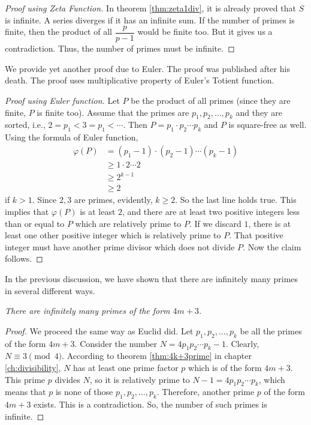 \documentclass{subfiles}
\begin{document}
		\begin{proof}[Proof using Zeta Function]
			In theorem \autoref{thm:zeta1div}, it is already proved that $S$ is infinite. A series diverges if it has an infinite sum. If the number of primes is finite, then the product of all $\dfrac p{p-1}$ would be finite too. But it gives us a contradiction. Thus, the number of primes must be infinite.
		\end{proof}
	We provide yet another proof due to Euler. The proof was published after his death. The proof uses multiplicative property of Euler's Totient function.
		\begin{proof}[Proof using Euler function]
			Let $P$ be the product of all primes (since they are finite, $P$ is finite too). Assume that the primes are $p_1,p_2,\ldots, p_k$ and they are sorted, i.e., $2=p_1<3=p_1<\cdots$. Then $P = p_1\cdot p_2\cdots p_k$ and $P$ is square-free as well. Using the formula of Euler function,
				\begin{align*}
					\varphi(P)  & = (p_1-1)\cdot(p_2-1)\cdots(p_k-1)\\
							& \geq 1\cdot2\cdots2\\
							& \geq 2^{k-1}\\
							& \geq 2
				\end{align*}
			if $k>1$. Since $2,3$ are primes, evidently, $k\geq2$. So the last line holds true. This implies that $\varphi(P)$ is at least $2$, and there are at least two positive integers less than or equal to $P$ which are relatively prime to $P$. If we discard $1$, there is at least one other positive integer which is relatively prime to $P$. That positive integer must have another prime divisor which does not divide $P$. Now the claim follows.
		\end{proof}
	In the previous discussion, we have shown that there are infinitely many primes in several different ways.
		\begin{theorem}\slshape
			There are infinitely many primes of the form $4m+3$.
		\end{theorem}

		\begin{proof}
			We proceed the same way as Euclid did. Let $p_1,p_2,\ldots,p_k$ be all the primes of the form $4m+3$. Consider the number $N=4p_1p_2\cdots p_k-1$. Clearly, $N\equiv3\pmod4$. According to theorem \autoref{thm:4k+3prime} in chapter \eqref{ch:divisibility}, $N$ has at least one prime factor $p$ which is of the form $4m+3$. This prime $p$ divides $N$, so it is relatively prime to $N-1=4p_1p_2\cdots p_k$, which means that $p$ is none of those $p_1,p_2,\ldots,p_k$. Therefore, another prime $p$ of the form $4m+3$ exists. This is a contradiction. So, the number of such primes is infinite.
		\end{proof}
\end{document}
